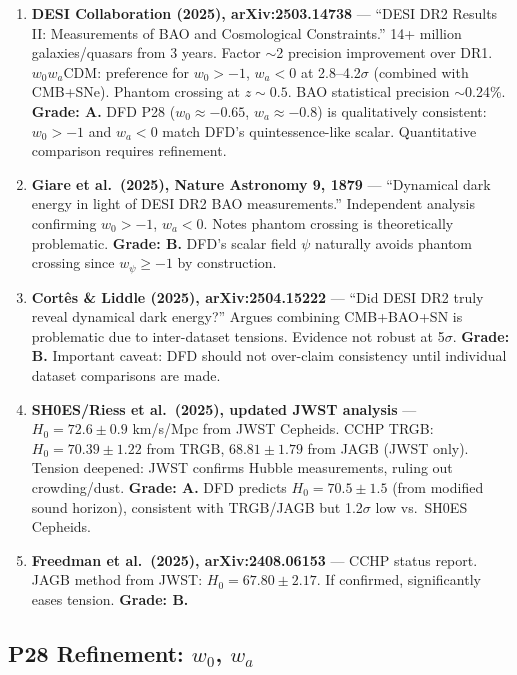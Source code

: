 \documentclass[11pt,a4paper]{article}
\begin{document}
\begin{enumerate}

\item \textbf{DESI Collaboration (2025), arXiv:2503.14738} --- ``DESI DR2 Results II: Measurements of BAO and Cosmological Constraints.'' 14+ million galaxies/quasars from 3 years. Factor $\sim$2 precision improvement over DR1. $w_0w_a$CDM: preference for $w_0 > -1$, $w_a < 0$ at 2.8--4.2$\sigma$ (combined with CMB+SNe). Phantom crossing at $z\sim0.5$. BAO statistical precision $\sim$0.24\%. \textbf{Grade: A.} DFD P28 ($w_0 \approx -0.65$, $w_a \approx -0.8$) is qualitatively consistent: $w_0 > -1$ and $w_a < 0$ match DFD's quintessence-like scalar. Quantitative comparison requires refinement.

\item \textbf{Giare et al.\ (2025), Nature Astronomy 9, 1879} --- ``Dynamical dark energy in light of DESI DR2 BAO measurements.'' Independent analysis confirming $w_0 > -1$, $w_a < 0$. Notes phantom crossing is theoretically problematic. \textbf{Grade: B.} DFD's scalar field $\psi$ naturally avoids phantom crossing since $w_\psi \geq -1$ by construction.

\item \textbf{Cort\^{e}s \& Liddle (2025), arXiv:2504.15222} --- ``Did DESI DR2 truly reveal dynamical dark energy?'' Argues combining CMB+BAO+SN is problematic due to inter-dataset tensions. Evidence not robust at 5$\sigma$. \textbf{Grade: B.} Important caveat: DFD should not over-claim consistency until individual dataset comparisons are made.

\item \textbf{SH0ES/Riess et al.\ (2025), updated JWST analysis} --- $H_0 = 72.6 \pm 0.9$ km/s/Mpc from JWST Cepheids. CCHP TRGB: $H_0 = 70.39 \pm 1.22$ from TRGB, $68.81 \pm 1.79$ from JAGB (JWST only). Tension deepened: JWST confirms Hubble measurements, ruling out crowding/dust. \textbf{Grade: A.} DFD predicts $H_0 = 70.5 \pm 1.5$ (from modified sound horizon), consistent with TRGB/JAGB but 1.2$\sigma$ low vs.\ SH0ES Cepheids.

\item \textbf{Freedman et al.\ (2025), arXiv:2408.06153} --- CCHP status report. JAGB method from JWST: $H_0 = 67.80 \pm 2.17$. If confirmed, significantly eases tension. \textbf{Grade: B.}

\end{enumerate}

\subsection{P28 Refinement: $w_0$, $w_a$}
\end{document}
